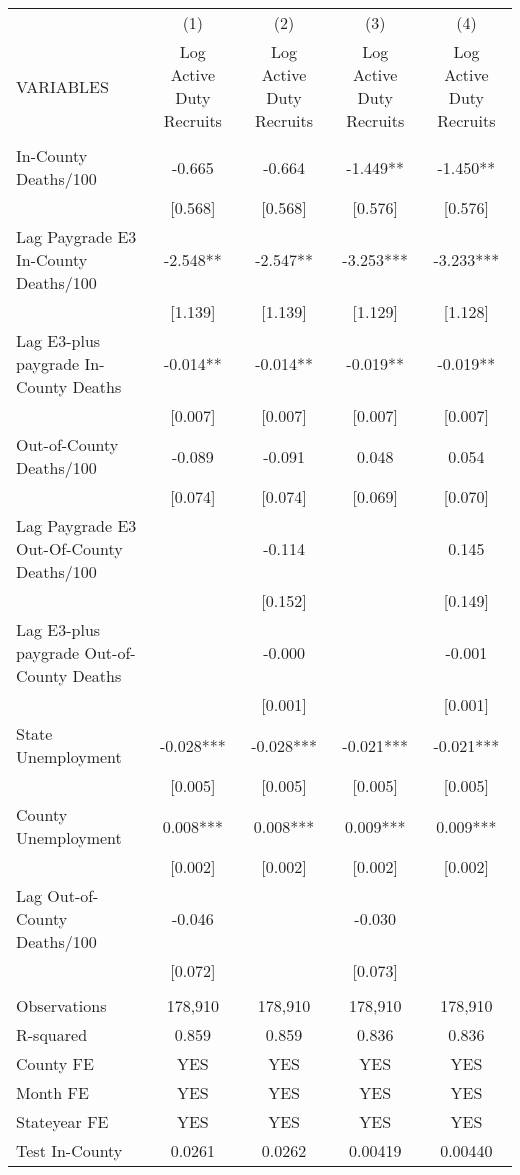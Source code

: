 \documentclass[]{article}
\begin{document}
\begin{tabular}{lcccc} \hline
 & (1) & (2) & (3) & (4) \\
VARIABLES & Log Active Duty Recruits & Log Active Duty Recruits & Log Active Duty Recruits & Log Active Duty Recruits \\ \hline
 &  &  &  &  \\
In-County Deaths/100 & -0.665 & -0.664 & -1.449** & -1.450** \\
 & [0.568] & [0.568] & [0.576] & [0.576] \\
Lag Paygrade E3 In-County Deaths/100 & -2.548** & -2.547** & -3.253*** & -3.233*** \\
 & [1.139] & [1.139] & [1.129] & [1.128] \\
Lag E3-plus paygrade In-County Deaths & -0.014** & -0.014** & -0.019** & -0.019** \\
 & [0.007] & [0.007] & [0.007] & [0.007] \\
Out-of-County Deaths/100 & -0.089 & -0.091 & 0.048 & 0.054 \\
 & [0.074] & [0.074] & [0.069] & [0.070] \\
Lag Paygrade E3 Out-Of-County Deaths/100 &  & -0.114 &  & 0.145 \\
 &  & [0.152] &  & [0.149] \\
Lag E3-plus paygrade Out-of-County Deaths &  & -0.000 &  & -0.001 \\
 &  & [0.001] &  & [0.001] \\
State Unemployment & -0.028*** & -0.028*** & -0.021*** & -0.021*** \\
 & [0.005] & [0.005] & [0.005] & [0.005] \\
County Unemployment & 0.008*** & 0.008*** & 0.009*** & 0.009*** \\
 & [0.002] & [0.002] & [0.002] & [0.002] \\
Lag Out-of-County Deaths/100 & -0.046 &  & -0.030 &  \\
 & [0.072] &  & [0.073] &  \\
 &  &  &  &  \\
Observations & 178,910 & 178,910 & 178,910 & 178,910 \\
R-squared & 0.859 & 0.859 & 0.836 & 0.836 \\
County FE & YES & YES & YES & YES \\
Month FE & YES & YES & YES & YES \\
Stateyear FE & YES & YES & YES & YES \\
Test In-County & 0.0261 & 0.0262 & 0.00419 & 0.00440 \\

\end{tabular}
\end{document}
